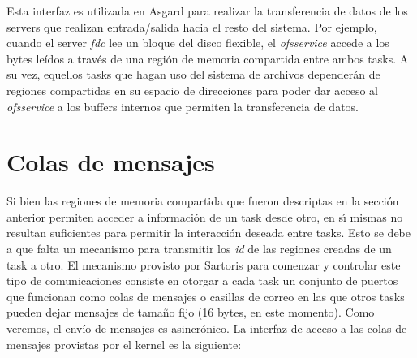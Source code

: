 \documentclass[11pt, letterpaper, twoside]{book}
\begin{document}
Esta interfaz es utilizada en Asgard para realizar la transferencia de datos de los servers que realizan entrada/salida hacia el resto del sistema. Por ejemplo, cuando el server \emph{fdc} lee un bloque del disco flexible, el \emph{ofsservice} accede a los bytes le\'idos a trav\'es de una regi\'on de memoria compartida entre ambos tasks. A su vez, equellos tasks que hagan uso del sistema de archivos depender\'an de regiones compartidas en su espacio de direcciones para poder dar acceso al \emph{ofsservice} a los buffers internos que permiten la transferencia de datos.


\section{Colas de mensajes}

Si bien las regiones de memoria compartida que fueron descriptas en la secci\'on anterior permiten acceder a informaci\'on de un task desde otro, en s\'\i{} mismas no resultan suficientes para permitir la interacci\'on deseada entre tasks. Esto se debe a que falta un mecanismo para transmitir los \emph{id} de las regiones creadas de un task a otro. El mecanismo provisto por Sartoris para comenzar y controlar este tipo de comunicaciones consiste en otorgar a cada task un conjunto de puertos que funcionan como colas de mensajes o casillas de correo en las que otros tasks pueden dejar mensajes de tama\~no fijo (16 bytes, en este momento). Como veremos, el env\'io de mensajes es asincr\'onico. La interfaz de acceso a las colas de mensajes provistas por el kernel es la siguiente:
\end{document}

